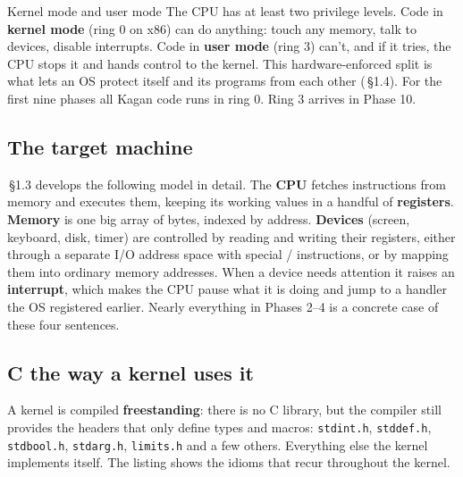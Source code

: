 \documentclass[11pt,a4paper]{article}
\begin{document}
\begin{conceptbox}{Kernel mode and user mode}
The CPU has at least two privilege levels. Code in \textbf{kernel mode} (ring 0 on x86) can do anything: touch any
memory, talk to devices, disable interrupts. Code in \textbf{user mode} (ring 3) can't, and if it tries, the CPU
stops it and hands control to the kernel. This hardware-enforced split is what lets an OS protect itself and its
programs from each other (\OSC\,\S1.4). For the first nine phases all Kagan code runs in ring 0. Ring 3 arrives
in Phase 10.
\end{conceptbox}

\subsection{The target machine}

\MOS\,\S1.3 develops the following model in detail. The \textbf{CPU} fetches instructions from memory and executes them,
keeping its working values in a handful of \textbf{registers}. \textbf{Memory} is one big array of bytes, indexed by
address. \textbf{Devices} (screen, keyboard, disk, timer) are controlled by reading and writing their registers,
either through a separate I/O address space with special / instructions, or by mapping them into
ordinary memory addresses. When a device needs attention it raises an \textbf{interrupt}, which makes the CPU pause
what it is doing and jump to a handler the OS registered earlier. Nearly everything in Phases 2--4 is a concrete case
of these four sentences.

\subsection{C the way a kernel uses it}

A kernel is compiled \textbf{freestanding}: there is no C library, but the compiler still provides the headers that
only define types and macros: \texttt{stdint.h}, \texttt{stddef.h}, \texttt{stdbool.h}, \texttt{stdarg.h},
\texttt{limits.h} and a few others. Everything else the kernel implements itself. The listing shows the idioms that recur
throughout the kernel.
\end{document}
